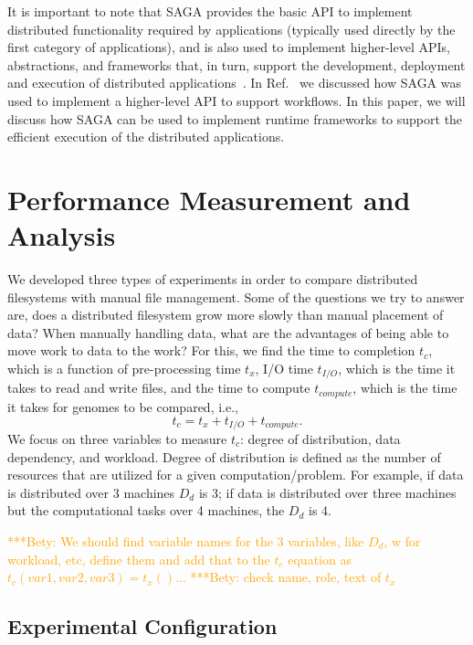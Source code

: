\documentclass{rspublic}
\newcommand{\micnote}[1]{ {\textcolor{blue} { ***Michael: #1 }}}
\newcommand{\betynote}[1]{ {\textcolor{orange} { ***Bety: #1 }}}
\newcommand{\jhanote}[1]{} \newcommand{\micnote}[1]{}\newcommand{\betynote}[1]{} \newcommand{\fixme}[1]{}
\begin{document}
It is important to note that SAGA provides the basic API to implement
distributed functionality required by applications (typically used
directly by the first category of applications), and is also used to
implement higher-level APIs, abstractions, and frameworks that, in
turn, support the development, deployment and execution of distributed
applications~\cite{enkf-gmac09}. In Ref.~\cite{sagamontage09} we
discussed how SAGA was used to implement a higher-level API to support
workflows. In this paper, we will discuss how SAGA can be used to
implement runtime frameworks to support the efficient execution of the
distributed applications.


\section{Performance Measurement and Analysis} We developed three types
of experiments in order to compare distributed filesystems with manual
file management. Some of the questions we try to answer are, does a
distributed filesystem grow more slowly than manual placement of data?
When manually handling data, what are the advantages of being able to
move work to data to the work? For this, we find the time to completion
$t_c$, which is a function of pre-processing time $t_x$, I/O time
$t_{I/O}$, which is the time it takes to read and write files, and the
time to compute $t_{compute}$, which is the time it takes for genomes to
be compared, i.e.,
 \begin{equation}
t_c = t_x + t_{I/O} + t_{compute}.
\end{equation}
We focus on three variables to measure $t_c$: degree of distribution,
data dependency, and workload. Degree of distribution is defined as
the number of resources that are utilized for a given
computation/problem. For example, if data is distributed over 3
machines $D_d$ is 3; if data is distributed over three machines but
the computational tasks over 4 machines, the $D_d$ is 4.

\betynote{We should find variable names for the 3 variables, like $D_d$,
w for workload, etc, define them and add that to the $t_c$ equation as
$t_c(var1, var2, var3) = t_x()$...}
\betynote{check name, role, text of $t_x$}
\jhanote{not sure that data-dependency needs a variable}

\subsection{Experimental Configuration}
\end{document}
